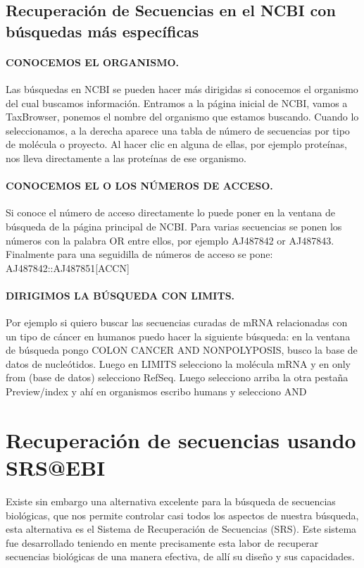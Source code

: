 \documentclass[letter,11pt]{book}
\begin{document}
\subsection{Recuperación de Secuencias en el NCBI con búsquedas más específicas}

\paragraph{CONOCEMOS EL ORGANISMO.} Las búsquedas en NCBI se pueden hacer más dirigidas si conocemos el organismo del cual buscamos información. Entramos a la página inicial de NCBI, vamos a TaxBrowser, ponemos el nombre del organismo que estamos buscando. Cuando lo seleccionamos, a la derecha aparece una tabla de número de secuencias por tipo de molécula o proyecto. Al hacer clic en alguna de ellas, por ejemplo proteínas, nos lleva directamente a las proteínas de ese organismo.

\paragraph{CONOCEMOS EL O LOS NÚMEROS DE ACCESO.} Si conoce el número de acceso directamente lo puede poner en la ventana de búsqueda de la página principal de NCBI. Para varias secuencias se ponen los números con la palabra OR entre ellos, por ejemplo AJ487842 or AJ487843. Finalmente para una seguidilla de números de acceso se pone: AJ487842::AJ487851[ACCN]

\paragraph{DIRIGIMOS LA BÚSQUEDA CON LIMITS.} Por ejemplo si quiero buscar las secuencias curadas de mRNA relacionadas con un tipo de cáncer en humanos puedo hacer la siguiente búsqueda: en la ventana de búsqueda pongo COLON CANCER AND NONPOLYPOSIS, busco la base de datos de nucleótidos. Luego en LIMITS selecciono la molécula mRNA y en only from (base de datos) selecciono RefSeq. Luego selecciono arriba la otra pestaña Preview/index y ahí en organismos escribo humans y selecciono AND

\section{Recuperación de secuencias usando SRS@EBI\label{srs}}

Existe sin embargo una alternativa excelente para la búsqueda de secuencias biológicas, que nos permite controlar casi todos los aspectos de nuestra búsqueda, esta alternativa es el Sistema de Recuperación de Secuencias (SRS). Este sistema fue desarrollado teniendo en mente precisamente esta labor de recuperar secuencias biológicas de una manera efectiva, de allí su diseño y sus capacidades.
\end{document}
